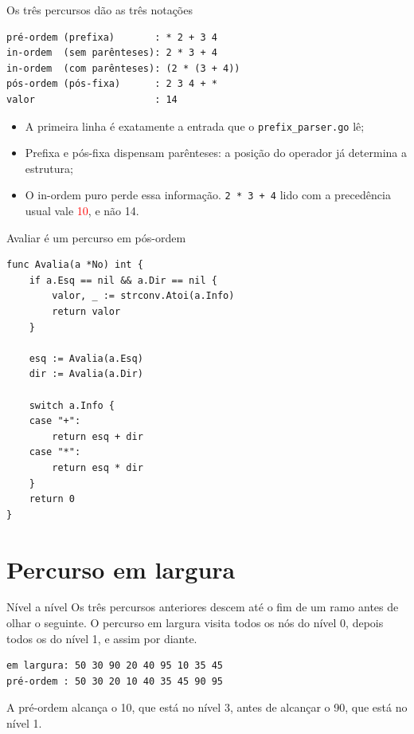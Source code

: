 \documentclass{beamer}
\newcommand{\tcr}[1]{\textcolor{red}{#1}}
\begin{document}
\begin{frame}[fragile]{Os três percursos dão as três notações}
  \begin{verbatim}
pré-ordem (prefixa)       : * 2 + 3 4
in-ordem  (sem parênteses): 2 * 3 + 4
in-ordem  (com parênteses): (2 * (3 + 4))
pós-ordem (pós-fixa)      : 2 3 4 + *
valor                     : 14
  \end{verbatim}

  \vspace{0.3cm}
  \begin{itemize}
    \item A primeira linha é exatamente a entrada que o
          \texttt{prefix\_parser.go} lê;
    \item Prefixa e pós-fixa dispensam parênteses: a posição do operador já
          determina a estrutura;
    \item O in-ordem puro perde essa informação. \texttt{2 * 3 + 4} lido com a
          precedência usual vale \tcr{10}, e não 14.
  \end{itemize}
\end{frame}

\begin{frame}[fragile]{Avaliar é um percurso em pós-ordem}
  \begin{verbatim}
func Avalia(a *No) int {
    if a.Esq == nil && a.Dir == nil {
        valor, _ := strconv.Atoi(a.Info)
        return valor
    }

    esq := Avalia(a.Esq)
    dir := Avalia(a.Dir)

    switch a.Info {
    case "+":
        return esq + dir
    case "*":
        return esq * dir
    }
    return 0
}
  \end{verbatim}
\end{frame}

\section{Percurso em largura}

\begin{frame}[fragile]{Nível a nível}
  Os três percursos anteriores descem até o fim de um ramo antes de olhar o
  seguinte. O percurso em largura visita todos os nós do nível 0, depois todos
  os do nível 1, e assim por diante.

  \vspace{0.4cm}
  \begin{verbatim}
em largura: 50 30 90 20 40 95 10 35 45
pré-ordem : 50 30 20 10 40 35 45 90 95
  \end{verbatim}

  \vspace{0.3cm}
  A pré-ordem alcança o 10, que está no nível 3, antes de alcançar o 90, que
  está no nível 1.
\end{frame}
\end{document}
